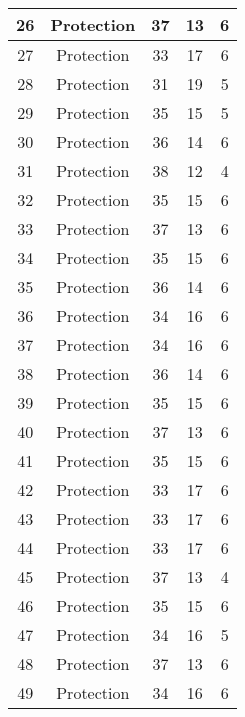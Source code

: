 \documentclass[results.tex]{subfiles}
\begin{document}
\begin{center}
\begin{tabular}{| c || c | c | c | c |}
    \hline
    26 & Protection & 37 & 13 & 6 \\ 
    \hline
    27 & Protection & 33 & 17 & 6 \\ 
    \hline
    28 & Protection & 31 & 19 & 5 \\ 
    \hline
    29 & Protection & 35 & 15 & 5 \\ 
    \hline
    30 & Protection & 36 & 14 & 6 \\ 
    \hline
    31 & Protection & 38 & 12 & 4 \\ 
    \hline
    32 & Protection & 35 & 15 & 6 \\ 
    \hline
    33 & Protection & 37 & 13 & 6 \\ 
    \hline
    34 & Protection & 35 & 15 & 6 \\ 
    \hline
    35 & Protection & 36 & 14 & 6 \\ 
    \hline
    36 & Protection & 34 & 16 & 6 \\ 
    \hline
    37 & Protection & 34 & 16 & 6 \\ 
    \hline
    38 & Protection & 36 & 14 & 6 \\ 
    \hline
    39 & Protection & 35 & 15 & 6 \\ 
    \hline
    40 & Protection & 37 & 13 & 6 \\ 
    \hline
    41 & Protection & 35 & 15 & 6 \\ 
    \hline
    42 & Protection & 33 & 17 & 6 \\ 
    \hline
    43 & Protection & 33 & 17 & 6 \\ 
    \hline
    44 & Protection & 33 & 17 & 6 \\ 
    \hline
    45 & Protection & 37 & 13 & 4 \\ 
    \hline
    46 & Protection & 35 & 15 & 6 \\ 
    \hline
    47 & Protection & 34 & 16 & 5 \\ 
    \hline
    48 & Protection & 37 & 13 & 6 \\ 
    \hline
    49 & Protection & 34 & 16 & 6 \\ 
    \hline   \end{tabular}
\end{center}
\end{document}

